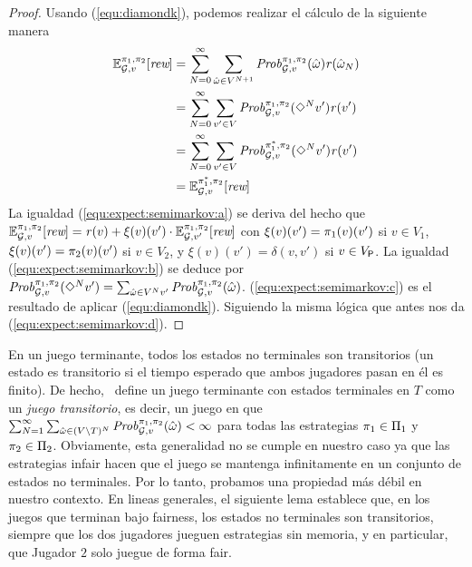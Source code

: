 \begin{proof}
  Usando (\ref{equ:diamondk}), podemos realizar el cálculo de la siguiente manera
  \begin{align}
  \mathbb{E}^{\pi_{1}, \pi_{2}}_{\mathcal{G},v}[\textit{rew}]   &  = \sum^\infty_{N=0} \sum_{\hat{\omega} \in V^{N+1}} \mathit{Prob}^{\pi_{1}, \pi_{2}}_{\mathcal{G},v}(\hat{\omega})\mathit{r}(\hat{\omega}_N) \label{equ:expect:semimarkov:a}\\
  & = \sum^\infty_{N=0} \sum_{v' \in V} \mathit{Prob}^{\pi_{1}, \pi_{2}}_{\mathcal{G},v}(\Diamond^N v')\mathit{r}(v') \label{equ:expect:semimarkov:b}\\
  & =  \sum^\infty_{N=0} \sum_{v' \in V} \mathit{Prob}^{\pi^*_{1}, \pi_{2}}_{\mathcal{G},v}(\Diamond^N v')\mathit{r}(v') \label{equ:expect:semimarkov:c}\\
  &  = \mathbb{E}^{\pi^*_{1}, \pi_{2}}_{\mathcal{G},v}[\textit{rew}] \label{equ:expect:semimarkov:d}
  \end{align}
  La igualdad (\ref{equ:expect:semimarkov:a}) se deriva del hecho que 
  $\mathbb{E}^{\pi_{1}, \pi_{2}}_{\mathcal{G},v}[\textit{rew}]= \mathit{r}(v) + \xi(v)(v') \cdot \mathbb{E}^{\pi_{1}, \pi_{2}}_{\mathcal{G},v'}[\textit{rew}]$
  con $\xi(v)(v')=\pi_{1}(v)(v')$ si $v\in V_1$,
  $\xi(v)(v')=\pi_{2}(v)(v')$ si $v\in V_2$, y $\xi(v)(v')=\delta(v,v')$
  si $v\in V_{\mathsf{P}}$.
  La igualdad (\ref{equ:expect:semimarkov:b}) se deduce por
  $\mathit{Prob}^{\pi_{1}, \pi_{2}}_{\mathcal{G},v}(\Diamond^N v')=\sum_{\hat{\omega} \in V^{N}v'} \mathit{Prob}^{\pi_{1}, \pi_{2}}_{\mathcal{G},v}(\hat{\omega})$.
  (\ref{equ:expect:semimarkov:c}) es el resultado de aplicar
  (\ref{equ:diamondk}).
  Siguiendo la misma lógica que antes nos da (\ref{equ:expect:semimarkov:d}).
\qedhere
\end{proof}
%


En un juego terminante, todos los estados no terminales son transitorios (un estado es
transitorio si el tiempo esperado que ambos jugadores pasan en él es
finito). De hecho, \cite{FilarV96}~define un juego terminante con
estados terminales en $T$ como un \emph{juego transitorio}, es decir, un juego en
que $\sum^\infty_{N=1} \sum_{\hat{\omega} \in (V \setminus T)^{N}}
\mathit{Prob}^{\pi_{1}, \pi_{2}}_{\mathcal{G},v}(\hat{\omega}) < \infty$ para
todas las estrategias $\pi_{1}\in\Pi_{1}$ y $\pi_{2}\in\Pi_{2}$.
%
Obviamente, esta generalidad no se cumple en nuestro caso ya que las
estrategias infair hacen que el juego se mantenga infinitamente en un conjunto de estados no terminales.
%
Por lo tanto, probamos una propiedad más débil en nuestro contexto. En lineas generales,
el siguiente lema establece que, en los juegos que terminan bajo fairness,
los estados no terminales son transitorios, siempre que los dos jugadores jueguen
estrategias sin memoria, y en particular, que Jugador $2$ solo juegue de forma
fair.

